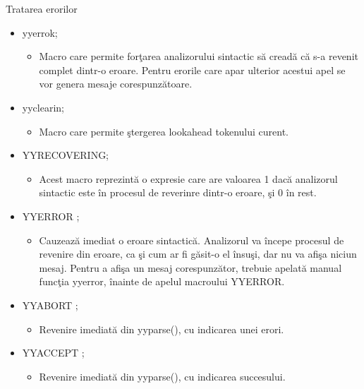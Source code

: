 \documentclass[pdf]{beamer}
\begin{document}
\begin{frame}[shrink=10]{Tratarea erorilor}
\begin{itemize}
	\item
	yyerrok;

	\begin{itemize}
		\item<cir@1->
		Macro care permite forţarea analizorului sintactic să creadă că s-a revenit complet dintr-o eroare. Pentru erorile care apar ulterior acestui apel se vor genera mesaje corespunzătoare.
	\end{itemize}

	\item
	yyclearin;

	\begin{itemize}
		\item<cir@1->
		Macro care permite ştergerea lookahead tokenului curent.
	\end{itemize}

	\item
	YYRECOVERING;

	\begin{itemize}
		\item<cir@1->
		Acest macro reprezintă o expresie care are valoarea 1 dacă analizorul sintactic este în procesul de reverinre dintr-o eroare, şi 0 în rest.
	\end{itemize}

	\item
	YYERROR ;

	\begin{itemize}
		\item<cir@1->
		Cauzează imediat o eroare sintactică. Analizorul va începe procesul de revenire din eroare, ca şi cum ar fi găsit-o el însuşi, dar nu va afişa niciun mesaj. Pentru a afişa un mesaj corespunzător, trebuie apelată manual funcţia yyerror, înainte de apelul macroului YYERROR.
	\end{itemize}

	\item
	YYABORT  ;

	\begin{itemize}
		\item<cir@1->
		Revenire imediată din yyparse(), cu indicarea unei erori.
	\end{itemize}

	\item
	YYACCEPT  ;

	\begin{itemize}
		\item<cir@1->
		Revenire imediată din yyparse(), cu indicarea succesului.
	\end{itemize}
\end{itemize}
\end{frame}
\end{document}
